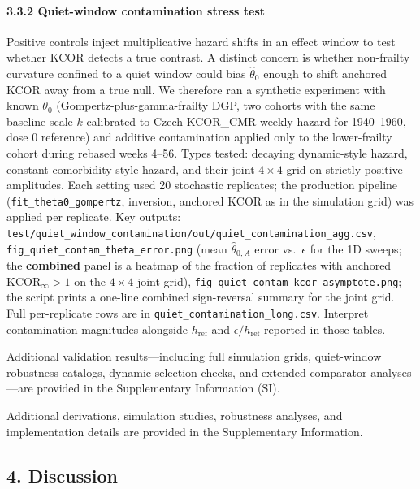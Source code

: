 \documentclass[
]{article}
\begin{document}
\paragraph{3.3.2 Quiet-window contamination stress
test}\label{quiet-window-contamination-stress-test}

Positive controls inject multiplicative hazard shifts in an effect window
to test whether KCOR detects a true contrast. A distinct concern is
whether non-frailty curvature confined to a quiet window could bias
\(\hat\theta_{0}\) enough to shift anchored KCOR away from a true null.
We therefore ran a synthetic experiment with known \(\theta_{0}\)
(Gompertz-plus-gamma-frailty DGP, two cohorts with the same baseline scale
\(k\) calibrated to Czech KCOR\_CMR weekly hazard for 1940--1960, dose 0
reference) and additive contamination applied only to the lower-frailty
cohort during rebased weeks 4--56. Types tested: decaying dynamic-style
hazard, constant comorbidity-style hazard, and their joint \(4\times4\)
grid on strictly positive amplitudes. Each setting used 20 stochastic
replicates; the production pipeline (\texttt{fit\_theta0\_gompertz},
inversion, anchored KCOR as in the simulation grid) was applied per
replicate. Key outputs:
\texttt{test/quiet\_window\_contamination/out/quiet\_contamination\_agg.csv},
\texttt{fig\_quiet\_contam\_theta\_error.png} (mean
\(\hat\theta_{0,A}\) error vs.\ \(\epsilon\) for the 1D sweeps; the
\textbf{combined} panel is a heatmap of the fraction of replicates with
anchored \(\mathrm{KCOR}_\infty>1\) on the \(4\times4\) joint grid),
\texttt{fig\_quiet\_contam\_kcor\_asymptote.png}; the script prints a
one-line combined sign-reversal summary for the joint grid. Full
per-replicate rows are in \texttt{quiet\_contamination\_long.csv}.
Interpret contamination magnitudes alongside \(h_{\mathrm{ref}}\) and
\(\epsilon/h_{\mathrm{ref}}\) reported in those tables.

Additional validation results---including full simulation grids, quiet-window
robustness catalogs, dynamic-selection checks, and extended comparator
analyses---are provided in the Supplementary Information (SI).

Additional derivations, simulation studies, robustness analyses, and
implementation details are provided in the Supplementary Information.

\subsection{4. Discussion}\label{discussion}
\end{document}
